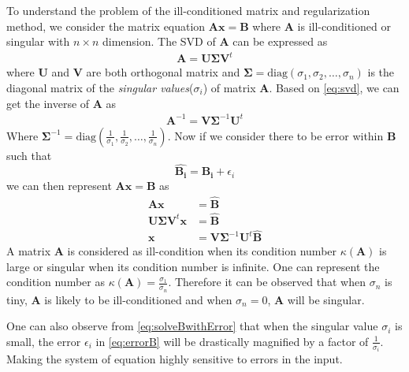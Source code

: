 \documentclass{book}
\begin{document}
			To understand the problem of the ill-conditioned matrix and regularization method, we consider the matrix equation $\boldsymbol{Ax}=\boldsymbol{B}$ where $\boldsymbol{A}$ is ill-conditioned or singular with $n\times n$ dimension.
			The \gls{SVD} of $\boldsymbol{A}$ can be expressed as 
			\begin{align}
				\boldsymbol{A} = \boldsymbol{U\Sigma V}^t
				\label{eq:svd}
			\end{align}
			where $\boldsymbol{U}$ and $\boldsymbol{V}$ are both orthogonal matrix and $\boldsymbol{\Sigma}=\mathrm{diag}(\sigma_1,\sigma_2,\dots,\sigma_n)$ is the diagonal matrix of the \emph{singular values}($\sigma_i$) of matrix $\boldsymbol{A}$.
			Based on \cref{eq:svd}, we can get the inverse of $\boldsymbol{A}$ as 
			\begin{align}
				\boldsymbol{A}^{-1}= \boldsymbol{V\Sigma}^{-1}\boldsymbol{U}^t
				\label{eq:svdInverse}
			\end{align}
			Where $
			\boldsymbol{\Sigma}^{-1} = \mathrm{diag}(\frac{1}{\sigma_1},\frac{1}{\sigma_2},\dots,\frac{1}{\sigma_n})$.
			Now if we consider there to be error within $\boldsymbol{B}$ such that
			\begin{equation}
				\boldsymbol{\hat{B_i}} = \boldsymbol{B_i}+\epsilon_i
				\label{eq:errorB}
			\end{equation}
			we can then represent $\boldsymbol{Ax}=\boldsymbol{B}$ as
			\begin{align}
				\boldsymbol{Ax}&=\boldsymbol{\hat{B}} \nonumber\\
				\boldsymbol{U\Sigma V}^t\boldsymbol{x}&=\boldsymbol{\hat{B}} \nonumber\\
				\boldsymbol{x}&=\boldsymbol{V\Sigma}^{-1}\boldsymbol{U}^t\boldsymbol{\hat{B}}
				\label{eq:solveBwithError}
			\end{align}
			A matrix $\boldsymbol{A}$ is considered as ill-condition when its condition number $\kappa(\boldsymbol{A})$ is large or singular when its condition number is infinite. 
			One can represent the condition number as $\kappa(\boldsymbol{A})=\frac{\sigma_1}{\sigma_n}$.
			Therefore it can be observed that when $\sigma_n$ is tiny, $\boldsymbol{A}$ is likely to be ill-conditioned and when $\sigma_n=0$, $\boldsymbol{A}$ will be singular. 
			
			One can also observe from \cref{eq:solveBwithError} that when the singular value $\sigma_i$ is small, the error $\epsilon_i$ in \cref{eq:errorB} will be drastically magnified by a factor of $\frac{1}{\sigma_i}$. 
			Making the system of equation highly sensitive to errors in the input.
			
\end{document}

